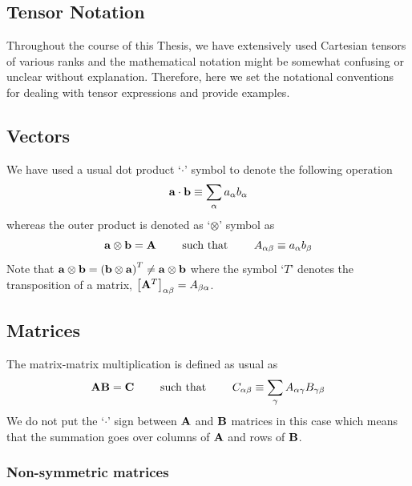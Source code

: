 \documentclass[a4paper,titlepage,twoside,fleqn,12pt]{book}
\begin{document}
\begin{appendices}

\chapter{Tensor Notation\label{a:tensor-notation}}

Throughout the course of this Thesis, we have extensively used Cartesian tensors
of various ranks and the mathematical notation might be somewhat confusing
or unclear without explanation. Therefore, here we set the notational conventions
for dealing with tensor expressions and provide examples.

\section{Vectors}

We have used a usual dot product `$\cdot$' symbol to denote the following
operation
%
\begin{equation}
 {\bf a} \cdot {\bf b} \equiv \sum_\alpha a_\alpha b_\alpha
\end{equation}
%
whereas the outer product is denoted as `$\otimes$' symbol as
%
\begin{equation}
 {\bf a} \otimes {\bf b} = {\bf A} 
 \qquad\text{ such that } 
 \qquad A_{\alpha\beta}  \equiv a_\alpha b_\beta
\end{equation}
%
Note that ${\bf a} \otimes {\bf b} = \left( {\bf b} \otimes {\bf a} \right)^T \ne 
{\bf a} \otimes {\bf b}$ where the symbol `$T$' denotes the transposition 
of a matrix, $\left[ {\bf A}^T\right]_{\alpha\beta}=A_{\beta\alpha}$.

\section{Matrices}

The matrix\hyp{}matrix multiplication is defined as usual as
%
\begin{equation}
 {\bf A} {\bf B} = {\bf C} 
 \qquad\text{ such that } 
 \qquad C_{\alpha\beta}  \equiv \sum_\gamma A_{\alpha\gamma} B_{\gamma\beta} 
\end{equation}
%
We do not put the `$\cdot$' sign between ${\bf A}$ and ${\bf B}$ matrices 
in this case which means that the summation
goes over columns of ${\bf A}$ and rows of ${\bf B}$.

\subsection{Non-symmetric matrices}


\end{appendices}
\end{document}
